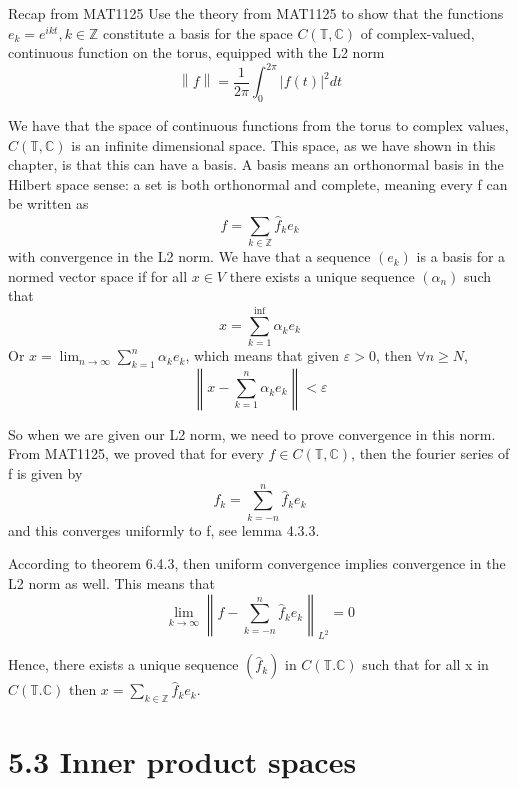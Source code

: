 \documentclass[a4paper,norsk]{article}
\renewcommand{\geq}{\geqslant}
\renewcommand{\epsilon}{\varepsilon}
\begin{document}
\begin{oppgavebox}{Recap from MAT1125}{}
Use the theory from MAT1125 to show that the functions $ e_k = e ^{ikt}, k \in \mathbb{Z}  $ constitute a basis for the space $ C \left( \mathbb{T}, \mathbb{C} \right)  $   of complex-valued, continuous function on the torus, equipped with the L2  norm 
\[
    \left\lVert f \right\rVert = \frac{ 1 }{ 2 \pi  } \int_{0}^{2 \pi } \left| f(t) \right| ^{2 } dt   
\]

\begin{proofbox}{}{}
  We have that the space of continuous functions from the torus to complex values, $ C \left( \mathbb{T}, \mathbb{C} \right)  $ is an infinite dimensional space. This space, as we have shown in this chapter, is that this can have a basis. A basis means an orthonormal basis in the Hilbert space sense: a set is both orthonormal and complete, meaning every f can be written as
  \[
      f = \sum_{k \in \mathbb{Z}}^{} \hat{f}_k e_k  
  \]
  with convergence in the L2 norm. We have that a sequence $ \left( e_k \right)  $ is a basis for a normed vector space if for all $ x \in V $  there exists a unique sequence $ \left( \alpha_{n}^{}  \right)  $ such that
  \[
      x = \sum_{k=1}^{\inf} \alpha_{k}^{} e_k 
  \]
  Or $ x = \lim_{n \to \infty} \sum_{k=1}^{n} \alpha_{k}^{} e_k  $, which means that given $ \epsilon > 0 $, then $ \forall n \geq N $,
  \[
      \left\lVert x - \sum_{k=1}^{n} \alpha_{k}^{} e_k  \right\rVert < \epsilon  
  \]

  So when we are given our L2 norm, we need to prove convergence in this norm. From MAT1125, we proved that for every $ f \in C \left( \mathbb{T}, \mathbb{C} \right)  $, then the fourier series of f is given by
  \[
      f_k = \sum_{k=-n}^{n} \hat{f}_k e_k 
  \]
  and this converges uniformly to f, see lemma 4.3.3.
  
  
  According to theorem 6.4.3, then uniform convergence implies convergence in the L2 norm as well. This means that 
  \[
      \lim_{k \to \infty} \left\lVert f - \sum_{k=-n}^{n} \hat{f}_k e_k  \right\rVert_{L^2}  = 0
  \]

  Hence, there exists a unique sequence $ \left( \hat{f}_k \right)  $ in $ C \left( \mathbb{T}. \mathbb{C} \right)  $ such that for all x in $ C \left( \mathbb{T}. \mathbb{C} \right) $ then $ x = \sum_{k \in \mathbb{Z}  }^{} \hat{f}_k e_k   $. 
\end{proofbox}
\end{oppgavebox}


\section*{5.3 Inner product spaces}
\end{document}
